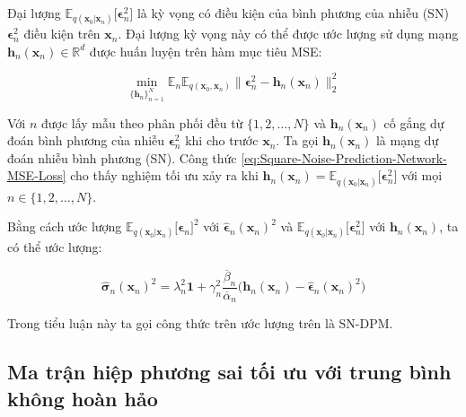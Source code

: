 \documentclass[14pt, a4paper]{article}
\numberwithin{equation}{section}
\numberwithin{figure}{section}
\numberwithin{dl}{section}
\numberwithin{md}{section}
\numberwithin{bd}{section}
\numberwithin{dn}{section}
\numberwithin{hq}{section}
\begin{document}
    Đại lượng $\mathbb{E}_{q(\boldsymbol{x}_0 \vert \boldsymbol{x}_n)} \lbrack \boldsymbol{\epsilon}_n^2 \rbrack$ là kỳ vọng có điều kiện của bình phương của nhiễu (SN) $\boldsymbol{\epsilon}_n^2$ điều kiện trên $\boldsymbol{x}_n$.
    Đại lượng kỳ vọng này có thể được ước lượng sử dụng mạng $\boldsymbol{h}_n (\boldsymbol{x}_n) \in \mathbb{R}^d$ được huấn luyện trên hàm mục tiêu MSE:

    \begin{equation} \label{eq:Square-Noise-Prediction-Network-MSE-Loss}
        \min_{\lbrace \boldsymbol{h}_n \rbrace_{n=1}^N} \mathbb{E}_n \mathbb{E}_{q(\boldsymbol{x}_0, \boldsymbol{x}_n)} \lVert \boldsymbol{\epsilon}_n^2 - \boldsymbol{h}_n (\boldsymbol{x}_n) \rVert_2^2
    \end{equation}

    Với $n$ được lấy mẫu theo phân phối đều từ $\lbrace 1, 2, \dots, N \rbrace$ và $\boldsymbol{h}_n (\boldsymbol{x}_n)$ cố gắng dự đoán bình phương của nhiễu $\boldsymbol{\epsilon}_n^2$ khi cho trước $\boldsymbol{x}_n$.
    Ta gọi $\boldsymbol{h}_n (\boldsymbol{x}_n)$ là mạng dự đoán nhiễu bình phương (SN).
    Công thức \ref{eq:Square-Noise-Prediction-Network-MSE-Loss} cho thấy nghiệm tối ưu xảy ra khi $\boldsymbol{h}_n (\boldsymbol{x}_n) = \mathbb{E}_{q(\boldsymbol{x}_0 \vert \boldsymbol{x}_n)} \lbrack \boldsymbol{\epsilon}_n^2 \rbrack$ với mọi $n \in \lbrace 1, 2, \dots, N \rbrace$.

    Bằng cách ước lượng $\mathbb{E}_{q(\boldsymbol{x}_0 \vert \boldsymbol{x}_n)} \lbrack \boldsymbol{\epsilon}_n \rbrack^2$ với $\hat{\boldsymbol{\epsilon}}_n (\boldsymbol{x}_n)^2$ và $\mathbb{E}_{q(\boldsymbol{x}_0 \vert \boldsymbol{x}_n)} \lbrack \boldsymbol{\epsilon}_n^2 \rbrack$ với $\boldsymbol{h}_n (\boldsymbol{x}_n)$,
    ta có thể ước lượng:

    \begin{equation} \label{eq:Sigma-SN-SPM}
        \hat{\boldsymbol{\sigma}}_n (\boldsymbol{x}_n)^2 = \lambda_n^2 \boldsymbol{1} + \gamma_n^2 \dfrac{\overline{\beta}_n}{\overline{\alpha}_n} \big( \boldsymbol{h}_n (\boldsymbol{x}_n) - \hat{\boldsymbol{\epsilon}}_n (\boldsymbol{x}_n)^2 \big)
    \end{equation}

    Trong tiểu luận này ta gọi công thức trên ước lượng trên là SN-DPM.

    \subsection{Ma trận hiệp phương sai tối ưu với trung bình không hoàn hảo} \label{Subsection:The-Optimal-Covariance-with-an-Imperfect-Mean}
\end{document}
